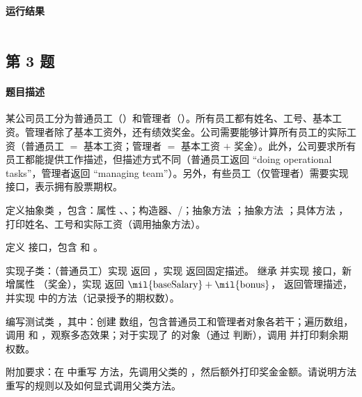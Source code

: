\documentclass{academics}
\begin{document}
\paragraph{运行结果} {
    \inputminted{text}{../res/P02.out}
}

\subsection{第 3 题}

\paragraph{题目描述} {
    某公司员工分为普通员工（）和管理者（）。所有员工都有姓名、工号、基本工资。管理者除了基本工资外，还有绩效奖金。公司需要能够计算所有员工的实际工资（普通员工 $=$ 基本工资；管理者 $=$ 基本工资 $+$ 奖金）。此外，公司要求所有员工都能提供工作描述，但描述方式不同（普通员工返回 ``doing operational tasks''，管理者返回 ``managing team''）。另外，有些员工（仅管理者）需要实现  接口，表示拥有股票期权。

    定义抽象类 ，包含：属性 、、；构造器、/；抽象方法 ；抽象方法 ；具体方法 ，打印姓名、工号和实际工资（调用抽象方法）。

    定义  接口，包含  和 。

    实现子类：（普通员工）实现  返回 ，实现  返回固定描述。 继承  并实现  接口，新增属性 （奖金），实现  返回 $\text{\mil{baseSalary}} + \text{\mil{bonus}}$， 返回管理描述，并实现  中的方法（记录授予的期权数）。

    编写测试类 ，其中：创建  数组，包含普通员工和管理者对象各若干；遍历数组，调用  和 ，观察多态效果；对于实现了  的对象（通过  判断），调用  并打印剩余期权数。

    附加要求：在  中重写  方法，先调用父类的 ，然后额外打印奖金金额。请说明方法重写的规则以及如何显式调用父类方法。
}
\end{document}
